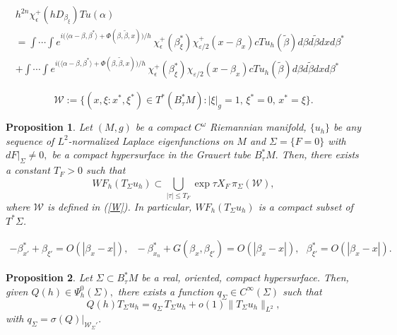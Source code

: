 \documentclass[10pt,a4paper]{amsart}
\newtheorem{proposition}{Proposition}
\newcommand{\ep}{\varepsilon}
\begin{document}
\begin{align} \label{wf4}
h^{2n} \chi_{\epsilon}^+( hD_{\beta_{\xi}} ) Tu(\alpha) \hspace{4in} \nonumber \\
= \int \cdots \int e^{i  \big( \langle \alpha - \beta, \beta^* \rangle  + \Phi(\beta,\tilde{\beta},x)  \big)/h } \, \chi_{\epsilon}^+ (\beta_{\xi}^*)  \chi_{\ep/2}^+ (x-\beta_x ) c Tu_h(\tilde{\beta})d\beta d\tilde{\beta} dx d\beta^* \nonumber \\
+ \int \cdots \int e^{i  \big( \langle \alpha - \beta, \beta^* \rangle  + \Phi(\beta,\tilde{\beta},x)  \big)/h } \, \chi_{\epsilon}^+ (\beta_{\xi}^*)  \chi_{\ep/2}(x-\beta_x ) cTu_h(\tilde{\beta})d\beta d\tilde{\beta} dx d\beta^*
\end{align}

\begin{equation} \label{W}
{\mathcal W}:= \big\{(x,\xi :x^*,\xi^*)\in T^*(B_{\tau}^*M): |\xi|_g=1, \, \xi^* = 0, \, x^* = \xi \big\}.
\end{equation}

\begin{proposition} \label{WF2}
Let $(M,g)$ be a compact $C^{\omega}$ Riemannian manifold, $\{ u_h \}$ be {\em any} sequence of $L^2$-normalized Laplace eigenfunctions on $M$ and $\Sigma=\{ F = 0 \}$ with $dF |_{\Sigma} \neq 0,$ be a compact hypersurface in the Grauert tube $B_{\tau}^*M.$ Then,    there exists a constant $T_F>0$ such that  \begin{equation}\label{wf1'}
        WF_h(T_{\Sigma}u_h)\subset \bigcup_{|\tau| \leq T_F} \exp \tau X_{F} \, \pi_{\Sigma}({\mathcal W}),
        \end{equation}
    where ${\mathcal W}$ is defined in (\ref{W}).
In particular, $WF_h(T_{\Sigma}u_h)$ is a  compact subset of $T^*\Sigma$.
\end{proposition}

\begin{eqnarray} \label{crit}
 - \beta_{x'}^* + \beta_{\xi'}  = O(|\beta_{x} -x|),  \,\,\,\, -\beta_{x_n}^* + G(\beta_x,\beta_{\xi'}) = O(|\beta_x -x|), \,\,\,\,
  \beta_{\xi'}^* = O(|\beta_x -x|). 
\end{eqnarray}

\begin{proposition} \label{multiplier}
Let $\Sigma \subset B_{\tau}^*M$ be a real, oriented,  compact hypersurface. Then, given $Q(h) \in \Psi_h^{0}(\Sigma),$ there exists a {\em function} $q_{\Sigma} \in C^{\infty}(\Sigma)$ such that
$$ Q(h) T_{\Sigma} u_h = q_{\Sigma} \,T_{\Sigma} u_h + o(1) \| T_{\Sigma} u_h \|_{L^2},$$
with $q_{\Sigma} = \sigma(Q) |_{{\mathcal W}_{\Sigma}'}.$ 
\end{proposition}
\end{document}
